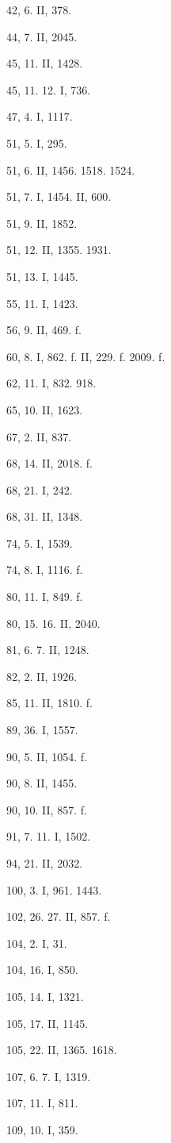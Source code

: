 42, 6. II, 378.

44, 7. II, 2045.

45, 11. II, 1428.

45, 11. 12. I, 736.

47, 4. I, 1117.

51, 5. I, 295.

51, 6. II, 1456. 1518. 1524.

51, 7. I, 1454. II, 600.

51, 9. II, 1852.

51, 12. II, 1355. 1931.

51, 13. I, 1445.

55, 11. I, 1423.

56, 9. II, 469. f.

60, 8. I, 862. f. II, 229. f. 2009. f.

62, 11. I, 832. 918.

65, 10. II, 1623.

67, 2. II, 837.

68, 14. II, 2018. f.

68, 21. I, 242.

68, 31. II, 1348.

74, 5. I, 1539.

74, 8. I, 1116. f.

80, 11. I, 849. f.

80, 15. 16. II, 2040.

81, 6. 7. II, 1248.

82, 2. II, 1926.

85, 11. II, 1810. f.

89, 36. I, 1557.

90, 5. II, 1054. f.

90, 8. II, 1455.

90, 10. II, 857. f.

91, 7. 11. I, 1502.

94, 21. II, 2032.

100, 3. I, 961. 1443.

102, 26. 27. II, 857. f.

104, 2. I, 31.

104, 16. I, 850.

105, 14. I, 1321.

105, 17. II, 1145.

105, 22. II, 1365. 1618.

107, 6. 7. I, 1319.

107, 11. I, 811.

109, 10. I, 359.

